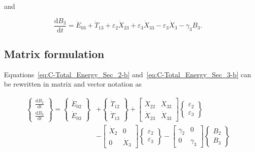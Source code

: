 \noindent{}and

\begin{equation} \label{eq:C-Total_Energy_Sec_3-b}
	\frac{\mathrm{d}B_{3}}{\mathrm{d}t}
	= \dot{E}_{03}
	+ \dot{T}_{13}
	+ \varepsilon_{2} \dot{X}_{23}
	+ \varepsilon_{3} \dot{X}_{33}
	- \varepsilon_{3} \dot{X}_{3}
	- \gamma_{3} B_{3}.
\end{equation}


\subsection{Matrix formulation} %
\label{sec:C-matrix}

\noindent{}Equations~\ref{eq:C-Total_Energy_Sec_2-b} 
and~\ref{eq:C-Total_Energy_Sec_3-b} can be rewritten 
in matrix and vector notation as

\begin{equation} \label{eq:C-Expanded_Matrix_Form}
	\begin{split}
		\begin{Bmatrix}
			\frac{\mathrm{d}B_{2}}{\mathrm{d}t} \\[0.4em] %
			\frac{\mathrm{d}B_{3}}{\mathrm{d}t} 
		\end{Bmatrix}
		=
		\begin{Bmatrix}
			\dot{E}_{02}\\
			\dot{E}_{03}
		\end{Bmatrix}
		& +                                               %
		\begin{Bmatrix}
			\dot{T}_{12}\\
			\dot{T}_{13}
		\end{Bmatrix}
		+
		\begin{bmatrix}
			\dot{X}_{22} & \dot{X}_{32}\\
			\dot{X}_{23} & \dot{X}_{33}
		\end{bmatrix}
		\begin{Bmatrix}
			\varepsilon_{2}\\
			\varepsilon_{3}
		\end{Bmatrix} \\                                  %
		& -                                               %
		\begin{bmatrix}
			\dot{X}_{2} & 0          \\
			0           & \dot{X}_{3}
		\end{bmatrix}
		\begin{Bmatrix}
			\varepsilon_{2}\\
			\varepsilon_{3}
		\end{Bmatrix}
		-
		\begin{bmatrix}
			\gamma_{2} & 0          \\
			0          & \gamma_{3}
		\end{bmatrix}
		\begin{Bmatrix}
			B_{2}\\
			B_{3}
		\end{Bmatrix}		
	\end{split}
\end{equation}

